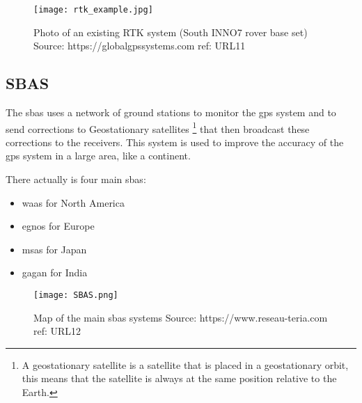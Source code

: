 \begin{figure}[H]
	\centering
	\texttt{[image: rtk\_example.jpg]}
	\caption[Real RTK system]{Photo of an existing RTK system (South INNO7 rover base set) Source: https://globalgpssystems.com ref: URL11}
	\label{fig:rtk_example}
\end{figure}


\subsection{SBAS}

The \gls{sbas} uses a network of ground stations to monitor the \gls{gps} system and to send corrections to Geostationary satellites \footnote{A geostationary satellite is a satellite that is placed in a geostationary orbit, this means that the satellite is always at the same position relative to the Earth.} that then broadcast these corrections to the receivers. This system is used to improve the accuracy of the \gls{gps} system in a large area, like a continent.

There actually is four main \gls{sbas}:

\begin{itemize}
	\item \gls{waas} for North America
	\item \gls{egnos} for Europe
	\item \gls{msas} for Japan
	\item \gls{gagan} for India
\end{itemize}

\begin{figure}[H]
	\centering
	\texttt{[image: SBAS.png]}
	\caption[Main SBAS Systems]{Map of the main \gls{sbas} systems  Source: https://www.reseau-teria.com ref: URL12}
	\label{fig:sbas}
\end{figure}